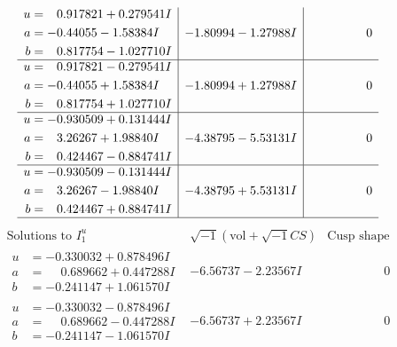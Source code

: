 \documentclass[1p]{elsarticle_modified}
\theoremstyle{definition}
\newcommand{\I}{\sqrt{-1}}
\begin{document}
$$\begin{array}{c|c|c}
\begin{aligned}
u &= \phantom{-}0.917821 + 0.279541 I \\
a &= -0.44055 - 1.58384 I \\
b &= \phantom{-}0.817754 - 1.027710 I\end{aligned}
 & -1.80994 - 1.27988 I & \phantom{-0.000000 } 0 \\ \hline\begin{aligned}
u &= \phantom{-}0.917821 - 0.279541 I \\
a &= -0.44055 + 1.58384 I \\
b &= \phantom{-}0.817754 + 1.027710 I\end{aligned}
 & -1.80994 + 1.27988 I & \phantom{-0.000000 } 0 \\ \hline\begin{aligned}
u &= -0.930509 + 0.131444 I \\
a &= \phantom{-}3.26267 + 1.98840 I \\
b &= \phantom{-}0.424467 - 0.884741 I\end{aligned}
 & -4.38795 - 5.53131 I & \phantom{-0.000000 } 0 \\ \hline\begin{aligned}
u &= -0.930509 - 0.131444 I \\
a &= \phantom{-}3.26267 - 1.98840 I \\
b &= \phantom{-}0.424467 + 0.884741 I\end{aligned}
 & -4.38795 + 5.53131 I & \phantom{-0.000000 } 0\\
 \hline 
 \end{array}$$\newpage$$\begin{array}{c|c|c}  
\text{Solutions to }I^u_{1}& \I (\text{vol} + \sqrt{-1}CS) & \text{Cusp shape}\\
 \hline 
\begin{aligned}
u &= -0.330032 + 0.878496 I \\
a &= \phantom{-}0.689662 + 0.447288 I \\
b &= -0.241147 + 1.061570 I\end{aligned}
 & -6.56737 - 2.23567 I & \phantom{-0.000000 } 0 \\ \hline\begin{aligned}
u &= -0.330032 - 0.878496 I \\
a &= \phantom{-}0.689662 - 0.447288 I \\
b &= -0.241147 - 1.061570 I\end{aligned}
 & -6.56737 + 2.23567 I & \phantom{-0.000000 } 0 \\ \hline\begin{aligned}

\end{aligned}
\end{array}$$
\end{document}
